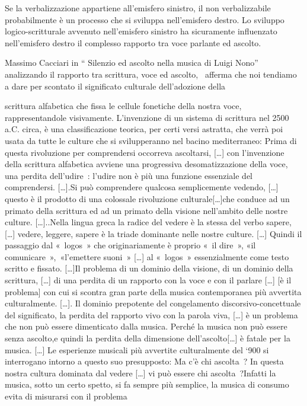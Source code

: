 Se la verbalizzazione appartiene all’emisfero sinistro, il non verbalizzabile
probabilmente è un processo che  si sviluppa nell’emisfero destro. Lo sviluppo
logico-scritturale avvenuto  nell’emisfero sinistro ha sicuramente influenzato
nell’emisfero destro il complesso rapporto  tra  voce parlante ed ascolto.

Massimo Cacciari in “ Silenzio ed ascolto nella musica di Luigi Nono”
analizzando  il rapporto tra scrittura, voce ed ascolto,  afferma che noi
tendiamo a dare per scontato il significato culturale dell’adozione della

scrittura alfabetica  che fissa  le cellule fonetiche della nostra voce,
rappresentandole visivamente. L’invenzione di un sistema di scrittura  nel
2500 a.C. circa, è una classificazione teorica, per certi versi astratta, che
verrà poi usata da tutte le culture che si svilupperanno nel bacino mediterraneo:
Prima di questa rivoluzione per comprendersi occorreva ascoltarsi, […] con
l’invenzione della scrittura alfabetica avviene una progressiva desomatizzazione
della voce, una perdita dell’udire : l’udire non è più una funzione essenziale
del comprendersi. […].Si può comprendere qualcosa semplicemente vedendo, […]
questo è il prodotto di una colossale rivoluzione culturale[…]che conduce ad un
primato della scrittura  ed ad un primato della visione nell’ambito delle nostre
culture. […]..Nella lingua greca la radice del vedere è la stessa del verbo
sapere, […] vedere, leggere, sapere è la triade dominante nelle nostre culture.
[…] Quindi il passaggio dal « logos » che originariamente è proprio « il dire »,
«il comunicare », «l’emettere suoni » […] al « logos » essenzialmente come testo
scritto e fissato. […]Il problema di un dominio della visione, di un dominio della
scrittura, […] di una perdita di un rapporto con la voce e con il parlare […]
[è il problema] con cui si scontra gran parte della musica contemporanea più
avvertita culturalmente. […]. Il dominio prepotente del congelamento
discorsivo-concettuale del significato, la perdita del rapporto vivo con la
parola viva, […] è un problema che non può essere dimenticato dalla musica.
Perché la musica non può essere senza ascolto,e quindi la perdita della
dimensione dell’ascolto[…] è fatale per la musica. […] Le esperienze musicali
più avvertite culturalmente  del ‘900 si interrogano intorno a questo suo
presupposto: Ma c’è chi ascolta ? In questa nostra cultura dominata dal vedere
[…] vi può essere chi ascolta ?Infatti la musica, sotto un certo spetto, si fa
sempre più semplice, la musica di consumo evita di misurarsi  con il problema
